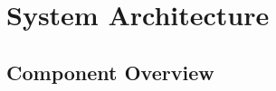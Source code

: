 \documentclass[10pt,twocolumn]{article}
\begin{document}
\section{System Architecture}


\subsection{Component Overview}
\end{document}
